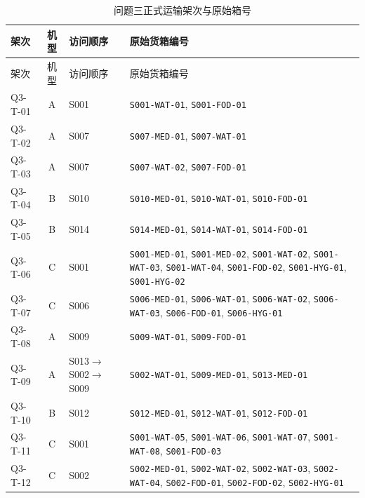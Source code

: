 \begin{longtable}{@{}lc>{\raggedright\arraybackslash}p{2.8cm}>{\raggedright\arraybackslash}p{8.8cm}@{}}
\caption{问题三正式运输架次与原始箱号}\label{tab:app_q3_boxes}\\
\toprule
架次 & 机型 & 访问顺序 & 原始货箱编号\\
\midrule
\endfirsthead
\toprule
架次 & 机型 & 访问顺序 & 原始货箱编号\\
\midrule
\endhead
Q3-T-01 & A & S001 & \texttt{S001-WAT-01}\allowbreak, \texttt{S001-FOD-01}\allowbreak\\
Q3-T-02 & A & S007 & \texttt{S007-MED-01}\allowbreak, \texttt{S007-WAT-01}\allowbreak\\
Q3-T-03 & A & S007 & \texttt{S007-WAT-02}\allowbreak, \texttt{S007-FOD-01}\allowbreak\\
Q3-T-04 & B & S010 & \texttt{S010-MED-01}\allowbreak, \texttt{S010-WAT-01}\allowbreak, \texttt{S010-FOD-01}\allowbreak\\
Q3-T-05 & B & S014 & \texttt{S014-MED-01}\allowbreak, \texttt{S014-WAT-01}\allowbreak, \texttt{S014-FOD-01}\allowbreak\\
Q3-T-06 & C & S001 & \texttt{S001-MED-01}\allowbreak, \texttt{S001-MED-02}\allowbreak, \texttt{S001-WAT-02}\allowbreak, \texttt{S001-WAT-03}\allowbreak, \texttt{S001-WAT-04}\allowbreak, \texttt{S001-FOD-02}\allowbreak, \texttt{S001-HYG-01}\allowbreak, \texttt{S001-HYG-02}\allowbreak\\
Q3-T-07 & C & S006 & \texttt{S006-MED-01}\allowbreak, \texttt{S006-WAT-01}\allowbreak, \texttt{S006-WAT-02}\allowbreak, \texttt{S006-WAT-03}\allowbreak, \texttt{S006-FOD-01}\allowbreak, \texttt{S006-HYG-01}\allowbreak\\
Q3-T-08 & A & S009 & \texttt{S009-WAT-01}\allowbreak, \texttt{S009-FOD-01}\allowbreak\\
Q3-T-09 & A & S013$\to$S002$\to$S009 & \texttt{S002-WAT-01}\allowbreak, \texttt{S009-MED-01}\allowbreak, \texttt{S013-MED-01}\allowbreak\\
Q3-T-10 & B & S012 & \texttt{S012-MED-01}\allowbreak, \texttt{S012-WAT-01}\allowbreak, \texttt{S012-FOD-01}\allowbreak\\
Q3-T-11 & C & S001 & \texttt{S001-WAT-05}\allowbreak, \texttt{S001-WAT-06}\allowbreak, \texttt{S001-WAT-07}\allowbreak, \texttt{S001-WAT-08}\allowbreak, \texttt{S001-FOD-03}\allowbreak\\
Q3-T-12 & C & S002 & \texttt{S002-MED-01}\allowbreak, \texttt{S002-WAT-02}\allowbreak, \texttt{S002-WAT-03}\allowbreak, \texttt{S002-WAT-04}\allowbreak, \texttt{S002-FOD-01}\allowbreak, \texttt{S002-FOD-02}\allowbreak, \texttt{S002-HYG-01}\allowbreak\\

\end{longtable}
